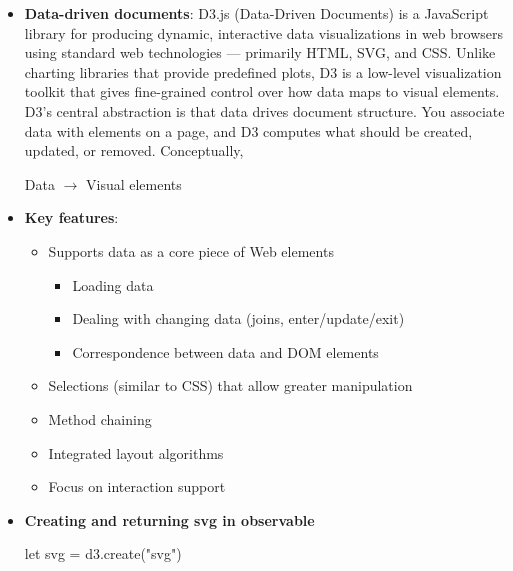 \documentclass{report}
\begin{document}
    \pagebreak 
    \begin{itemize}
        \item \textbf{Data-driven documents}: D3.js (Data-Driven Documents) is a JavaScript library for producing dynamic, interactive data visualizations in web browsers using standard web technologies — primarily HTML, SVG, and CSS. Unlike charting libraries that provide predefined plots, D3 is a low-level visualization toolkit that gives fine-grained control over how data maps to visual elements.
            \bigbreak \noindent 
            D3’s central abstraction is that data drives document structure. You associate data with elements on a page, and D3 computes what should be created, updated, or removed.
            \bigbreak \noindent 
            Conceptually,
            \begin{center}
                Data $\to$ Visual elements
            \end{center}
        \item \textbf{Key features}: 
            \begin{itemize}
                \item Supports data as a core piece of Web elements
                    \begin{itemize}
                        \item Loading data
                        \item Dealing with changing data (joins, enter/update/exit)
                        \item Correspondence between data and DOM elements               
                    \end{itemize}
                \item Selections (similar to CSS) that allow greater manipulation
                \item Method chaining
                \item Integrated layout algorithms
                \item Focus on interaction support
            \end{itemize}
        \item \textbf{Creating and returning svg in observable}
            \bigbreak \noindent 
            \begin{jscode}
            {
                let svg = d3.create("svg")

}
\end{jscode}
\end{itemize}
\end{document}
